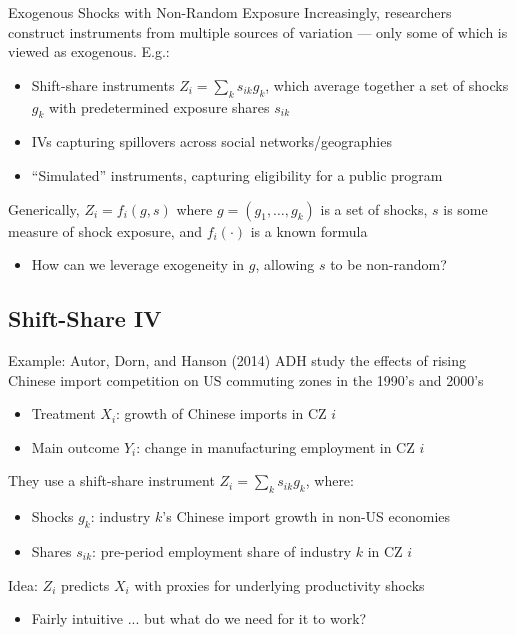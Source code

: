 \documentclass{beamer}
\begin{document}
\begin{frame}{Exogenous Shocks with Non-Random Exposure}
Increasingly, researchers construct instruments from multiple sources of variation --- only some of which is viewed as exogenous. E.g.:
\begin{itemize}
\item Shift-share instruments $Z_i=\sum_k s_{ik}g_k$, which average together a set of shocks $g_k$ with predetermined exposure shares $s_{ik}$
\item IVs capturing spillovers across social networks/geographies 
\item ``Simulated'' instruments, capturing eligibility for a public program
\end{itemize}\medskip\pause{}

Generically, $Z_i=f_i(g,s)$ where $g=(g_1,\dots,g_k)$ is a set of shocks, $s$ is some measure of shock exposure, and $f_i(\cdot)$ is a known formula
\begin{itemize}
\item How can we leverage exogeneity in $g$, allowing $s$ to be non-random?
\end{itemize}

\end{frame}

\subsection{Shift-Share IV}

\begin{frame}{Example: Autor, Dorn, and Hanson (2014)}
ADH study the effects of rising Chinese import competition on US commuting zones in the 1990's and 2000's
\begin{itemize}
\item Treatment $X_{i}$: growth of Chinese imports in CZ $i$
\item Main outcome $Y_{i}$: change in manufacturing employment in CZ $i$
\end{itemize}\medskip\pause{}

They use a shift-share instrument $Z_{i}=\sum_k s_{ik}g_{k}$, where:
\begin{itemize}
\item Shocks $g_k$: industry $k$'s Chinese import growth in non-US economies
\item Shares $s_{ik}$: pre-period employment share of industry $k$ in CZ $i$
\end{itemize}\medskip\pause{}

Idea: $Z_i$ predicts $X_i$ with proxies for underlying productivity shocks  
\begin{itemize}
\item Fairly intuitive ... but what do we need for it to work? 
\end{itemize}
\end{frame}
\end{document}
